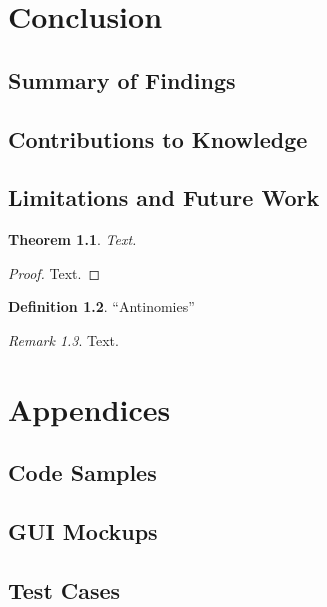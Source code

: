 \documentclass{thesis-ekf}
\newtheorem{theorem}{Theorem}[chapter]
\theoremstyle{definition}
\newtheorem{definition}[theorem]{Definition}
\theoremstyle{remark}
\newtheorem{remark}[theorem]{Remark}
\begin{document}
\chapter{Conclusion}
\section{Summary of Findings}
\section{Contributions to Knowledge}
\section{Limitations and Future Work}







\begin{theorem}
Text.
\end{theorem}

\begin{proof}
Text.
\end{proof}

\begin{definition}
``Antinomies''
\end{definition}

\begin{remark}
Text.
\end{remark}


\chapter{Appendices}

\section{Code Samples}
\section{GUI Mockups}
\section{Test Cases}
\end{document}
